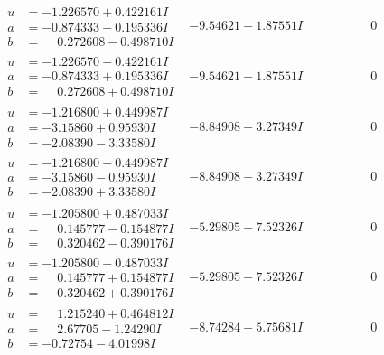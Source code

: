 \documentclass[1p]{elsarticle_modified}
\theoremstyle{definition}
\begin{document}
$$\begin{array}{c|c|c}
\begin{aligned}
u &= -1.226570 + 0.422161 I \\
a &= -0.874333 - 0.195336 I \\
b &= \phantom{-}0.272608 - 0.498710 I\end{aligned}
 & -9.54621 - 1.87551 I & \phantom{-0.000000 } 0 \\ \hline\begin{aligned}
u &= -1.226570 - 0.422161 I \\
a &= -0.874333 + 0.195336 I \\
b &= \phantom{-}0.272608 + 0.498710 I\end{aligned}
 & -9.54621 + 1.87551 I & \phantom{-0.000000 } 0 \\ \hline\begin{aligned}
u &= -1.216800 + 0.449987 I \\
a &= -3.15860 + 0.95930 I \\
b &= -2.08390 - 3.33580 I\end{aligned}
 & -8.84908 + 3.27349 I & \phantom{-0.000000 } 0 \\ \hline\begin{aligned}
u &= -1.216800 - 0.449987 I \\
a &= -3.15860 - 0.95930 I \\
b &= -2.08390 + 3.33580 I\end{aligned}
 & -8.84908 - 3.27349 I & \phantom{-0.000000 } 0 \\ \hline\begin{aligned}
u &= -1.205800 + 0.487033 I \\
a &= \phantom{-}0.145777 - 0.154877 I \\
b &= \phantom{-}0.320462 - 0.390176 I\end{aligned}
 & -5.29805 + 7.52326 I & \phantom{-0.000000 } 0 \\ \hline\begin{aligned}
u &= -1.205800 - 0.487033 I \\
a &= \phantom{-}0.145777 + 0.154877 I \\
b &= \phantom{-}0.320462 + 0.390176 I\end{aligned}
 & -5.29805 - 7.52326 I & \phantom{-0.000000 } 0 \\ \hline\begin{aligned}
u &= \phantom{-}1.215240 + 0.464812 I \\
a &= \phantom{-}2.67705 - 1.24290 I \\
b &= -0.72754 - 4.01998 I\end{aligned}
 & -8.74284 - 5.75681 I & \phantom{-0.000000 } 0\\

\end{array}$$
\end{document}
